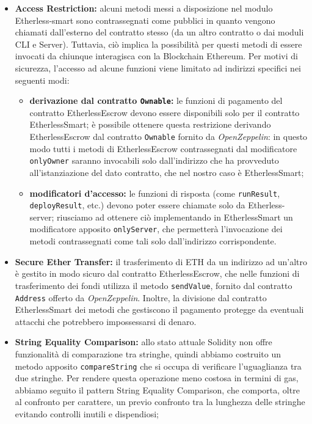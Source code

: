   \begin{itemize}
    \item \textbf{Access Restriction:} alcuni metodi messi a disposizione nel modulo Etherless-smart sono contrassegnati come pubblici in quanto vengono chiamati dall'esterno del contratto stesso (da un altro contratto o dai moduli CLI e Server). Tuttavia, ciò implica la possibilità per questi metodi di essere invocati da chiunque interagisca con la Blockchain Ethereum. Per motivi di sicurezza, l'accesso ad alcune funzioni viene limitato ad indirizzi specifici nei seguenti modi:
      \begin{itemize}
        \item \textbf{derivazione dal contratto \texttt{Ownable}:} le funzioni di pagamento del contratto EtherlessEscrow devono essere disponibili solo per il contratto EtherlessSmart; è possibile ottenere questa restrizione derivando EtherlessEscrow dal contratto \texttt{Ownable} fornito da \textit{OpenZeppelin}: in questo modo tutti i metodi di EtherlessEscrow contrassegnati dal modificatore \texttt{onlyOwner} saranno invocabili solo dall'indirizzo che ha provveduto all'istanziazione del dato contratto, che nel nostro caso è EtherlessSmart;
        \item \textbf{modificatori d'accesso:} le funzioni di risposta (come \texttt{runResult}, \texttt{deployResult}, etc.) devono poter essere chiamate solo da Etherless-server; riusciamo ad ottenere ciò implementando in EtherlessSmart un modificatore apposito \texttt{onlyServer}, che permetterà l'invocazione dei metodi contrassegnati come tali solo dall'indirizzo corrispondente.
      \end{itemize}

    \item \textbf{Secure Ether Transfer:} il trasferimento di ETH da un indirizzo ad un'altro è gestito in modo sicuro dal contratto EtherlessEscrow, che nelle funzioni di trasferimento dei fondi utilizza il metodo \texttt{sendValue}, fornito dal contratto \texttt{Address} offerto da \textit{OpenZeppelin}. Inoltre, la divisione dal contratto EtherlessSmart dei metodi che gestiscono il pagamento protegge da eventuali attacchi che potrebbero impossessarsi di denaro.

    \item \textbf{String Equality Comparison:} allo stato attuale Solidity non offre funzionalità di comparazione tra stringhe, quindi abbiamo costruito un metodo apposito \texttt{compareString} che si occupa di verificare l'uguaglianza tra due stringhe. Per rendere questa operazione meno costosa in termini di gas, abbiamo seguito il pattern String Equality Comparison, che comporta, oltre al confronto per carattere, un previo confronto tra la lunghezza delle stringhe evitando controlli inutili e dispendiosi;
  \end{itemize}

